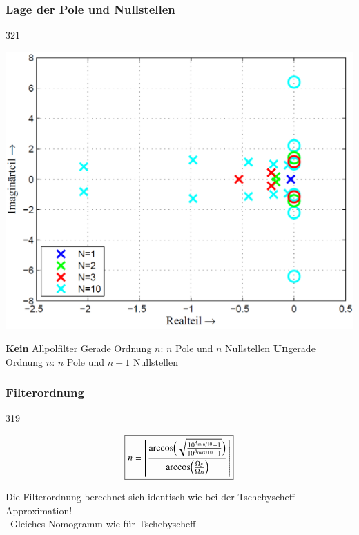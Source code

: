 \subsubsection{Lage der Pole und Nullstellen}{321}

\begin{minipage}[c]{0.4\columnwidth}
    \includegraphics[width=\columnwidth]{images/filter_tschebyscheff_invers_pollage.png}
\end{minipage}
\hfill
\begin{minipage}[c]{0.58\columnwidth}
    \begin{outline}
        \1 \textbf{Kein} Allpolfilter
            \2 Gerade Ordnung $n$: $n$ Pole und $n$ Nullstellen
            \2 \textbf{Un}gerade Ordnung $n$: $n$ Pole und $n-1$ Nullstellen
    \end{outline}
\end{minipage}


\subsubsection{Filterordnung}{319}

\begin{minipage}[c]{0.4\columnwidth}
    $$ \boxed{ n =  \left\lceil \frac{\arccos \Bigl( \sqrt{ \frac{10^{A_{\rm min / 10}} - 1}{10^{A_{\rm max / 10}} - 1} } \Bigr) }
    {\arccos \Bigl( \frac{\Omega_S}{\Omega_D} \Bigr)}  \right\rceil } $$
\end{minipage}
\hfill
\begin{minipage}[c]{0.58\columnwidth}
    Die Filterordnung berechnet sich identisch wie bei der Tschebyscheff--Approximation! \\
    \textrightarrow\ Gleiches Nomogramm wie für Tschebyscheff-
\end{minipage}


